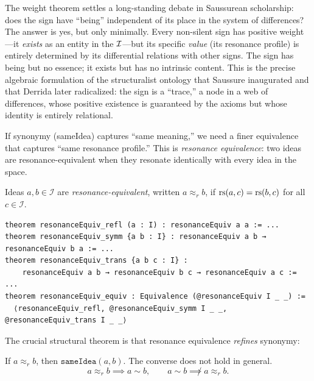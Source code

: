 \begin{remark}
The weight theorem settles a long-standing debate in Saussurean scholarship: does the sign have ``being'' independent of its place in the system of differences? The answer is yes, but only minimally. Every non-silent sign has positive weight---it \emph{exists} as an entity in the $\mathcal{I}$---but its specific \emph{value} (its resonance profile) is entirely determined by its differential relations with other signs. The sign has being but no essence; it exists but has no intrinsic content. This is the precise algebraic formulation of the structuralist ontology that Saussure inaugurated and that Derrida later radicalized: the sign is a ``trace,'' a node in a web of differences, whose positive existence is guaranteed by the axioms but whose identity is entirely relational.
\end{remark}

If synonymy (sameIdea) captures ``same meaning,'' we need a finer
equivalence that captures ``same resonance profile.'' This is
\emph{resonance equivalence}: two ideas are resonance-equivalent when
they resonate identically with every idea in the space.

\begin{definition}
\label{def:resonance-equiv}
Ideas $a, b \in \mathcal{I}$ are \emph{resonance-equivalent}, written
$a \approx_r b$, if $\mathrm{rs}(a, c) = \mathrm{rs}(b, c)$ for all $c \in \mathcal{I}$.
\end{definition}

\begin{lstlisting}[caption={Resonance equivalence forms an equivalence relation}]
theorem resonanceEquiv_refl (a : I) : resonanceEquiv a a := ...
theorem resonanceEquiv_symm {a b : I} : resonanceEquiv a b → resonanceEquiv b a := ...
theorem resonanceEquiv_trans {a b c : I} :
    resonanceEquiv a b → resonanceEquiv b c → resonanceEquiv a c := ...
theorem resonanceEquiv_equiv : Equivalence (@resonanceEquiv I _ _) :=
  ⟨resonanceEquiv_refl, @resonanceEquiv_symm I _ _, @resonanceEquiv_trans I _ _⟩
\end{lstlisting}

The crucial structural theorem is that resonance equivalence
\emph{refines} synonymy:

\begin{theorem}
\label{thm:refines}
If $a \approx_r b$, then $\texttt{sameIdea}(a, b)$. The converse
does not hold in general.
\[
  a \approx_r b \implies a \sim b, \qquad
  a \sim b \not\implies a \approx_r b.
\]
\end{theorem}

